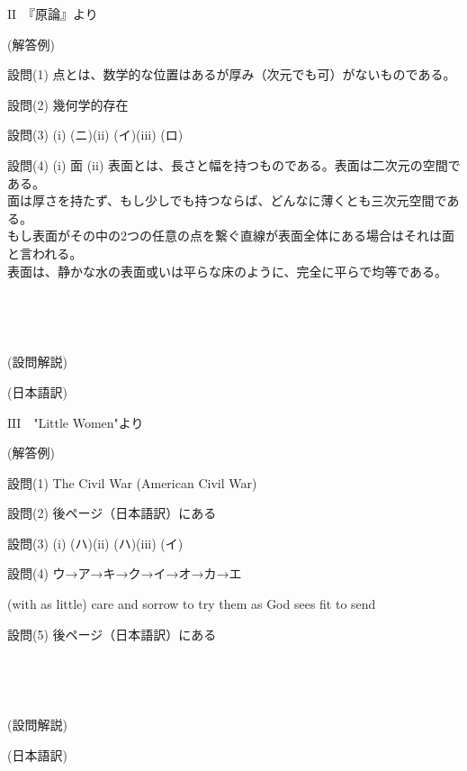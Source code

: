 \documentclass[12pt,a4paper,dvipdfmx]{jarticle}
\begin{document}
\begin{spacing}{1.5}
\newpage

{\Large\textbf{$\mathrm{II}$}}　『原論』より
  
(解答例)

設問(1) 点とは、数学的な位置はあるが厚み（次元でも可）がないものである。

設問(2) 幾何学的存在

設問(3) (i) (ニ)\hspace{5mm}(ii) (イ)\hspace{5mm}(iii) (ロ)

\begin{flushleft}
設問(4)
(i) 面
(ii) 表面とは、長さと幅を持つものである。表面は二次元の空間である。\\
        面は厚さを持たず、もし少しでも持つならば、どんなに薄くとも三次元空間である。\\
        もし表面がその中の2つの任意の点を繋ぐ直線が表面全体にある場合はそれは面と言われる。\\
        表面は、静かな水の表面或いは平らな床のように、完全に平らで均等である。
\end{flushleft}


\

\

(設問解説)


\newpage

(日本語訳)


\newpage

{\Large\textbf{$\mathrm{III}$}}　"Little Women"より

(解答例)

設問(1) The Civil War (American Civil War)

設問(2) 後ページ（日本語訳）にある

設問(3) (i) (ハ)\hspace{5mm}(ii) (ハ)\hspace{5mm}(iii) (イ)

設問(4) ウ→ア→キ→ク→イ→オ→カ→エ

(with as little) care and sorrow to try them as God sees fit to send

設問(5) 後ページ（日本語訳）にある

\

\

(設問解説)

\newpage

(日本語訳)





\end{spacing}
  
\end{document}
